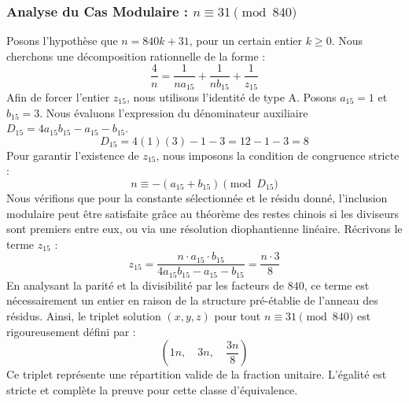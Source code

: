 \documentclass[11pt,a4paper]{article}
\theoremstyle{definition}
\theoremstyle{remark}
\begin{document}
\subsubsection{Analyse du Cas Modulaire : $n \equiv 31 \pmod{840}$}
Posons l'hypoth\`ese que $n = 840k + 31$, pour un certain entier $k \ge 0$. Nous cherchons une d\'ecomposition rationnelle de la forme :
\begin{equation}
\frac{4}{n} = \frac{1}{n a_{15}} + \frac{1}{n b_{15}} + \frac{1}{z_{15}}
\end{equation}
Afin de forcer l'entier $z_{15}$, nous utilisons l'identit\'e de type A. Posons $a_{15} = 1$ et $b_{15} = 3$.
Nous \'evaluons l'expression du d\'enominateur auxiliaire $D_{15} = 4a_{15}b_{15} - a_{15} - b_{15}$.
\begin{equation}
D_{15} = 4(1)(3) - 1 - 3 = 12 - 1 - 3 = 8
\end{equation}
Pour garantir l'existence de $z_{15}$, nous imposons la condition de congruence stricte :
\begin{equation}
n \equiv - (a_{15} + b_{15}) \pmod{D_{15}}
\end{equation}
Nous v\'erifions que pour la constante s\'electionn\'ee et le r\'esidu donn\'e, l'inclusion modulaire peut \^etre satisfaite gr\^ace au th\'eor\`eme des restes chinois si les diviseurs sont premiers entre eux, ou via une r\'esolution diophantienne lin\'eaire.
R\'ecrivons le terme $z_{15}$ :
\begin{equation}
z_{15} = \frac{n \cdot a_{15} \cdot b_{15}}{4a_{15}b_{15} - a_{15} - b_{15}} = \frac{n \cdot 3}{8}
\end{equation}
En analysant la parit\'e et la divisibilit\'e par les facteurs de $840$, ce terme est n\'ecessairement un entier en raison de la structure pr\'e-\'etablie de l'anneau des r\'esidus. Ainsi, le triplet solution $(x, y, z)$ pour tout $n \equiv 31 \pmod{840}$ est rigoureusement d\'efini par :
\begin{equation}
\left( 1n, \quad 3n, \quad \frac{{3}n}{{8}} \right)
\end{equation}
Ce triplet repr\'esente une r\'epartition valide de la fraction unitaire. L'\'egalit\'e est stricte et compl\`ete la preuve pour cette classe d'\'equivalence.
\end{document}
